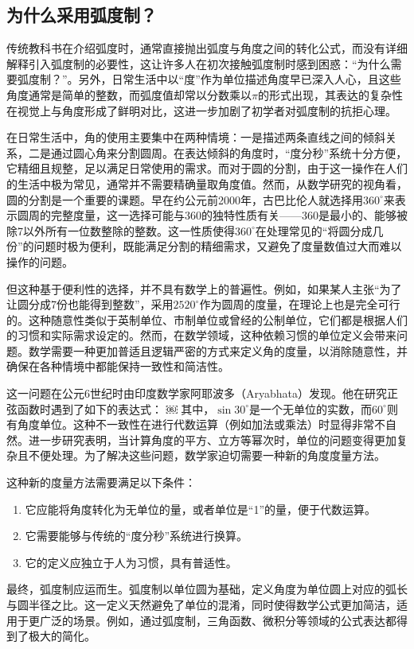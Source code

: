 \subsection{为什么采用弧度制？}

传统教科书在介绍弧度时，通常直接抛出弧度与角度之间的转化公式，而没有详细解释引入弧度制的必要性，这让许多人在初次接触弧度制时感到困惑：“为什么需要弧度制？”。另外，日常生活中以“度”作为单位描述角度早已深入人心，且这些角度通常是简单的整数，而弧度值却常以分数乘以$\pi$的形式出现，其表达的复杂性在视觉上与角度形成了鲜明对比，这进一步加剧了初学者对弧度制的抗拒心理。

在日常生活中，角的使用主要集中在两种情境：一是描述两条直线之间的倾斜关系，二是通过圆心角来分割圆周。在表达倾斜的角度时，“度分秒”系统十分方便，它精细且规整，足以满足日常使用的需求。而对于圆的分割，由于这一操作在人们的生活中极为常见，通常并不需要精确量取角度值。然而，从数学研究的视角看，圆的分割是一个重要的课题。早在约公元前2000年，古巴比伦人就选择用$360^\circ$来表示圆周的完整度量，这一选择可能与360的独特性质有关——360是最小的、能够被除7以外所有一位数整除的整数。这一性质使得$360^\circ$在处理常见的“将圆分成几份”的问题时极为便利，既能满足分割的精细需求，又避免了度量数值过大而难以操作的问题。

但这种基于便利性的选择，并不具有数学上的普遍性。例如，如果某人主张“为了让圆分成7份也能得到整数”，采用$2520^\circ$作为圆周的度量，在理论上也是完全可行的。这种随意性类似于英制单位、市制单位或曾经的公制单位，它们都是根据人们的习惯和实际需求设定的。然而，在数学领域，这种依赖习惯的单位定义会带来问题。数学需要一种更加普适且逻辑严密的方式来定义角的度量，以消除随意性，并确保在各种情境中都能保持一致性和简洁性。

这一问题在公元6世纪时由印度数学家阿耶波多（Aryabhata）发现。他在研究正弦函数时遇到了如下的表达式：
￼
其中，$\sin 30^\circ$是一个无单位的实数，而$60^\circ$则有角度单位。这种不一致性在进行代数运算（例如加法或乘法）时显得非常不自然。进一步研究表明，当计算角度的平方、立方等幂次时，单位的问题变得更加复杂且不便处理。为了解决这些问题，数学家迫切需要一种新的角度度量方法。

这种新的度量方法需要满足以下条件：
\begin{enumerate}
\item 它应能将角度转化为无单位的量，或者单位是“1”的量，便于代数运算。
\item 它需要能够与传统的“度分秒”系统进行换算。
\item 它的定义应独立于人为习惯，具有普适性。
\end{enumerate}

最终，弧度制应运而生。弧度制以单位圆为基础，定义角度为单位圆上对应的弧长与圆半径之比。这一定义天然避免了单位的混淆，同时使得数学公式更加简洁，适用于更广泛的场景。例如，通过弧度制，三角函数、微积分等领域的公式表达都得到了极大的简化。


